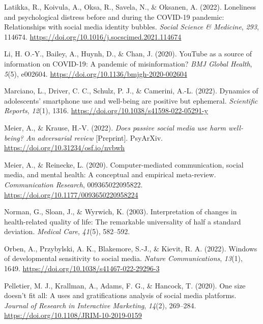 \documentclass[
  man,mask,floatsintext]{apa7}
\newlength{\cslhangindent}
\newenvironment{CSLReferences}[2] %
 {\begin{list}{}{%
  \setlength{\itemindent}{0pt}
  \setlength{\leftmargin}{0pt}
  \setlength{\parsep}{0pt}
  \ifodd #1
   \setlength{\leftmargin}{\cslhangindent}
   \setlength{\itemindent}{-1\cslhangindent}
  \fi
  \setlength{\itemsep}{#2\baselineskip}}}
 {\end{list}}
\begin{document}
\begin{CSLReferences}{1}{0}
Latikka, R., Koivula, A., Oksa, R., Savela, N., \& Oksanen, A. (2022). Loneliness and psychological distress before and during the {COVID-19} pandemic: {Relationships} with social media identity bubbles. \emph{Social Science \& Medicine}, \emph{293}, 114674. \url{https://doi.org/10.1016/j.socscimed.2021.114674}

Li, H. O.-Y., Bailey, A., Huynh, D., \& Chan, J. (2020). {YouTube} as a source of information on {COVID-19}: A pandemic of misinformation? \emph{BMJ Global Health}, \emph{5}(5), e002604. \url{https://doi.org/10.1136/bmjgh-2020-002604}

Marciano, L., Driver, C. C., Schulz, P. J., \& Camerini, A.-L. (2022). Dynamics of adolescents' smartphone use and well-being are positive but ephemeral. \emph{Scientific Reports}, \emph{12}(1), 1316. \url{https://doi.org/10.1038/s41598-022-05291-y}

Meier, A., \& Krause, H.-V. (2022). \emph{Does passive social media use harm well-being? {An} adversarial review} {[}Preprint{]}. PsyArXiv. \url{https://doi.org/10.31234/osf.io/nvbwh}

Meier, A., \& Reinecke, L. (2020). Computer-mediated communication, social media, and mental health: {A} conceptual and empirical meta-review. \emph{Communication Research}, 009365022095822. \url{https://doi.org/10.1177/0093650220958224}

Norman, G., Sloan, J., \& Wyrwich, K. (2003). Interpretation of changes in health-related quality of life: {The} remarkable universality of half a standard deviation. \emph{Medical Care}, \emph{41}(5), 582--592.

Orben, A., Przybylski, A. K., Blakemore, S.-J., \& Kievit, R. A. (2022). Windows of developmental sensitivity to social media. \emph{Nature Communications}, \emph{13}(1), 1649. \url{https://doi.org/10.1038/s41467-022-29296-3}

Pelletier, M. J., Krallman, A., Adams, F. G., \& Hancock, T. (2020). One size doesn't fit all: A uses and gratifications analysis of social media platforms. \emph{Journal of Research in Interactive Marketing}, \emph{14}(2), 269--284. \url{https://doi.org/10.1108/JRIM-10-2019-0159}


\end{CSLReferences}
\end{document}
